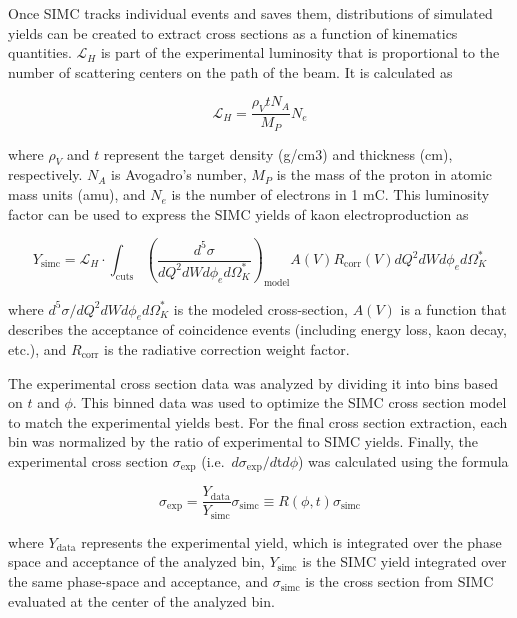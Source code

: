 \documentclass[
]{report}
\begin{document}
Once SIMC tracks individual events and saves them, distributions of
simulated yields can be created to extract cross sections as a function
of kinematics quantities. \(\mathcal{L}_H\) is part of the experimental
luminosity that is proportional to the number of scattering centers on
the path of the beam. It is calculated as

\begin{equation} 
  \mathcal{L}_H=\frac{\rho_VtN_A}{M_P}N_e
  \label{eq:lumi_exp} 
\end{equation}

\noindent where \(\rho_V\) and \(t\) represent the target density
(g/cm3) and thickness (cm), respectively. \(N_A\) is Avogadro's number,
\(M_P\) is the mass of the proton in atomic mass units (amu), and
\(N_e\) is the number of electrons in 1 mC. This luminosity factor can
be used to express the SIMC yields of kaon electroproduction as

\begin{equation} 
  Y_{\mathrm{simc}}=\mathcal{L}_H\cdot\int_{\mathrm{cuts}}(\frac{d^5\sigma}{dQ^2dWd\phi_ed\Omega_{K}^*})_{\mathrm{model}}A(V)R_{\mathrm{corr}}(V)dQ^2dWd\phi_ed\Omega_{K}^*
  \label{eq:yield_simc_lumi} 
\end{equation}

\noindent where \(d^5\sigma/dQ^2dWd\phi_ed\Omega_{K}^*\) is the modeled
cross-section, \(A(V)\) is a function that describes the acceptance of
coincidence events (including energy loss, kaon decay, etc.), and
\(R_{\mathrm{corr}}\) is the radiative correction weight factor.

\label{Chapter-5}

The experimental cross section data was analyzed by dividing it into
bins based on \(t\) and \(\phi\). This binned data was used to optimize
the SIMC cross section model to match the experimental yields best. For
the final cross section extraction, each bin was normalized by the ratio
of experimental to SIMC yields. Finally, the experimental cross section
\(\sigma_{\mathrm{exp}}\)
(i.e.~\(d\sigma_{\mathrm{exp}}/d\mathrm{t}d\phi\)) was calculated using
the formula

\begin{equation} 
\sigma_{\mathrm{exp}}=\frac{Y_{\mathrm{data}}}{Y_{\mathrm{simc}}}\sigma_{\mathrm{simc}}\equiv R(\phi,t)\sigma_{\mathrm{simc}}
  \label{eq:exp_sig} 
\end{equation}

\noindent where \(Y_{\mathrm{data}}\) represents the experimental yield,
which is integrated over the phase space and acceptance of the analyzed
bin, \(Y_{\mathrm{simc}}\) is the SIMC yield integrated over the same
phase-space and acceptance, and \(\sigma_{\mathrm{simc}}\) is the cross
section from SIMC evaluated at the center of the analyzed bin.
\end{document}
